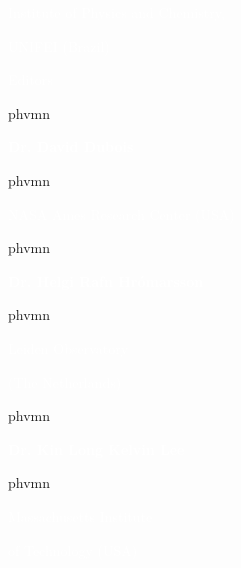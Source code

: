 \begin{multicols}{2}
\begin{shaded}
\textcolor{white}{Institute of Physics and Chemistry,}

\vspace{-0.15cm}

\textcolor{white}{UNIFEI (Brazil)}

\vspace{0.4cm}


\noindent \textcolor{white}{Editors}

\vspace{0.2cm}


\fontsize{14}{10}  {phv}{m}{n} \selectfont 

\textcolor{white}{\textbf{Dr. David Dubois}}

\fontsize{13}{10}  {phv}{m}{n} \selectfont 

\textcolor{white}{NASA Ames Research Center (USA)}

\vspace{0.2cm}


\fontsize{14}{10}  {phv}{m}{n} \selectfont 

\textcolor{white}{\textbf{Dr. Helgi Rafn Hró{\dh}marsson}}


\fontsize{13}{10}  {phv}{m}{n} \selectfont 

\textcolor{white}{Leiden Observatory}

\vspace{-0.15cm}

\textcolor{white}{(The Netherlands)}

\vspace{0.2cm}


\fontsize{14}{10}  {phv}{m}{n} \selectfont 

\textcolor{white}{\textbf{Dr. Kin Long Kelvin Lee}}

\fontsize{13}{10}  {phv}{m}{n} \selectfont 

\textcolor{white}{Massachusetts Institute}


\textcolor{white}{of Technology (USA)}

\vspace{0.2cm}


\end{shaded}
\end{multicols}
